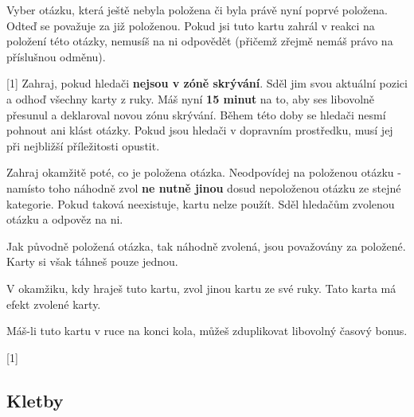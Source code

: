 \documentclass{book}
\def\timehidingmove/{15 minut}  %
\begin{document}
\begin{cards}
	 Vyber otázku, která ještě nebyla položena či byla právě nyní poprvé položena. Odteď se považuje za již položenou. Pokud jsi tuto kartu zahrál v reakci na položení této otázky, nemusíš na ni odpovědět (přičemž zřejmě nemáš právo na příslušnou odměnu).

	 Zahraj, pokud hledači \textbf{nejsou v zóně skrývání}. Sděl jim svou aktuální pozici a odhoď všechny karty z ruky. Máš nyní \textbf{\timehidingmove/} na to, aby ses libovolně přesunul a deklaroval novou zónu skrývání. Během této doby se hledači nesmí pohnout ani klást otázky. Pokud jsou hledači v dopravním prostředku, musí jej při nejbližší příležitosti opustit.



	 Zahraj okamžitě poté, co je položena otázka. Neodpovídej na položenou otázku - namísto toho náhodně zvol \textbf{ne nutně jinou} dosud nepoloženou otázku ze stejné kategorie. Pokud taková neexistuje, kartu nelze použít. Sděl hledačům zvolenou otázku a odpověz na ni.

		Jak původně položená otázka, tak náhodně zvolená, jsou považovány za položené. Karty si však táhneš pouze jednou.

	 V okamžiku, kdy hraješ tuto kartu, zvol jinou kartu ze své ruky. Tato karta má efekt zvolené karty.

		Máš-li tuto kartu v ruce na konci kola, můžeš zduplikovat libovolný časový bonus.

\end{cards}

\subsection{Kletby}\label{kletby}
\end{document}
